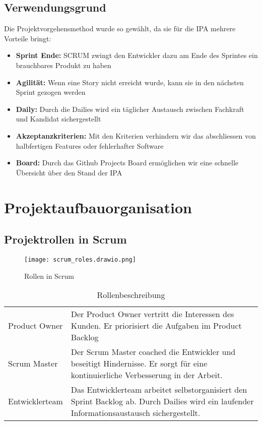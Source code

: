\section{Verwendungsgrund}
Die Projektvorgehensmethod wurde so gewählt, da sie für die IPA mehrere Vorteile bringt:

\begin{itemize}
    \item \textbf{Sprint Ende:} SCRUM zwingt den Entwickler dazu am Ende des Sprintes ein brauchbares Produkt zu haben
    \item \textbf{Agilität:} Wenn eine Story nicht erreicht wurde, kann sie in den nächsten Sprint gezogen werden
    \item \textbf{Daily:} Durch die Dailies wird ein täglicher Austausch zwischen Fachkraft und Kandidat sichergestellt
    \item \textbf{Akzeptanzkriterien:} Mit den Kriterien verhindern wir das abschliessen von halbfertigen Features oder fehlerhafter Software
    \item \textbf{Board:} Durch das Github Projects Board ermöglichen wir eine schnelle Übersicht über den Stand der IPA

\end{itemize}

\chapter{Projektaufbauorganisation}
\section{Projektrollen in Scrum}
\begin{figure}[h]
    \centering
    \texttt{[image: scrum\_roles.drawio.png]}
    \caption{Rollen in Scrum}
\end{figure}


\begin{table}[h!]
        \begin{tabular}{|L{0.4\textwidth}|L{0.5\textwidth}|}
            \hline
              \\[12pt]
            \hline
            Product Owner & Der Product Owner vertritt die Interessen des Kunden. Er priorisiert die Aufgaben im Product Backlog  \\
            \hline
            Scrum Master & Der Scrum Master coached die Entwickler und beseitigt Hindernisse. Er sorgt für eine 
            kontinuierliche Verbesserung in der Arbeit. \\
            \hline
            Entwicklerteam & Das Entwicklerteam arbeitet selbstorganisiert den Sprint Backlog ab. 
            Durch Dailies wird ein laufender Informationsaustausch sichergestellt. \\
            \hline
          \end{tabular}
          \caption{Rollenbeschreibung}
\end{table}

